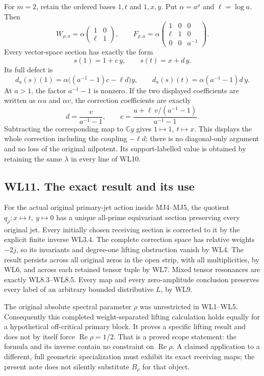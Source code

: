 For \(m=2\), retain the ordered bases \(1,t\) and \(1,x,y\). Put
\(\alpha=a^\rho\) and \(\ell=\log a\). Then \[
 W_{\rho,a}=\alpha
 \begin{pmatrix}1&0\\ \ell&1\end{pmatrix},\qquad
 F_{\rho,a}=\alpha
 \begin{pmatrix}1&0&0\\ \ell&1&0\\ 0&0&a^{-1}\end{pmatrix}.
\tag{WL10.1}
\] Every vector-space section has exactly the form \[
 s(1)=1+c\,y,\qquad s(t)=x+d\,y.
\] Its full defect is \[
 d_a(s)(1)=\alpha\bigl((a^{-1}-1)c-\ell d\bigr)y,
 \qquad
 d_a(s)(t)=\alpha(a^{-1}-1)d\,y.
\tag{WL10.2}
\] At \(a>1\), the factor \(a^{-1}-1\) is nonzero. If the two displayed
coefficients are written as \(\alpha u\) and \(\alpha v\), the
correction coefficients are exactly \[
 d=\frac{v}{a^{-1}-1},\qquad
 c=\frac{u+\ell\,v/(a^{-1}-1)}{a^{-1}-1}.
\tag{WL10.3}
\] Subtracting the corresponding map to \(\mathbb Cy\) gives
\(1\mapsto1,\ t\mapsto x\). This displays the whole correction including
the coupling \(-\ell d\); there is no diagonal-only argument and no loss
of the original nilpotent. Its support-labelled value is obtained by
retaining the same \(\lambda\) in every line of WL10.

\subsection{WL11. The exact result and its
use}\label{wl11.-the-exact-result-and-its-use}

For the actual original primary-jet action inside MJ4--MJ5, the quotient
\(q_\rho:x\mapsto t,\ y\mapsto0\) has a unique all-prime equivariant
section preserving every original jet. Every initially chosen receiving
section is corrected to it by the explicit finite inverse WL3.4. The
complete correction space has relative weights \(-2j\), so its
invariants and degree-one lifting obstruction vanish by WL4. The result
persists across all original zeros in the open strip, with all
multiplicities, by WL6, and across each retained tensor tuple by WL7.
Mixed tensor resonances are exactly WL8.3--WL8.5. Every map and every
zero-amplitude conclusion preserves every label of an arbitrary bounded
distributive \(L\), by WL9.

The original absolute spectral parameter \(\rho\) was unrestricted in
WL1--WL5. Consequently this completed weight-separated lifting
calculation holds equally for a hypothetical off-critical primary block.
It proves a specific lifting result and does not by itself force
\(\operatorname{Re}\rho=1/2\). That is a proved scope statement: the
formula and its inverse contain no constraint on
\(\operatorname{Re}\rho\). A claimed application to a different, full
geometric specialization must exhibit its exact receiving maps; the
present note does not silently substitute \(B_\rho\) for that object.

